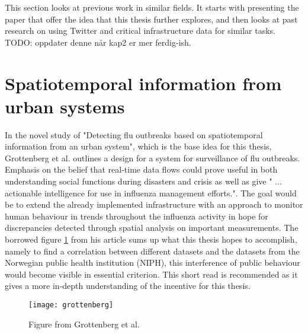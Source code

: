 This section looks at previous work in similar fields. It starts with presenting the paper that offer the idea that this thesis further explores, and then looks at past research on using Twitter and critical infrastructure data for similar tasks. TODO: oppdater denne når kap2 er mer ferdig-ish.

\section{Spatiotemporal information from urban systems}
In the novel study of "Detecting flu outbreaks based on spatiotemporal information from an urban system", which is the base idea for this thesis, Grottenberg et al. \cite{spatiotemp_urban_sys} outlines a design for a system for surveillance of flu outbreaks. Emphasis on the belief that real-time data flows could prove useful in both understanding social functions during disasters and crisis as well as give " ... actionable intelligence for use in influenza management efforts.". The goal would be to extend the already implemented infrastructure with an approach to monitor human behaviour in trends throughout the influenza activity in hope for discrepancies detected through spatial analysis on important measurements. The borrowed figure \ref{fig:grottenberg} from his article sums up what this thesis hopes to accomplish, namely to find a correlation between different datasets and the datasets from the Norwegian public health institution (NIPH), this interference of public behaviour would become visible in essential criterion.
This short read \cite{spatiotemp_urban_sys} is recommended as it gives a more in-depth understanding of the incentive for this thesis.

\begin{figure}[h]
\texttt{[image: grottenberg]}
\centering
\caption{Figure from Grottenberg et al. \cite{spatiotemp_urban_sys}}
\label{fig:grottenberg}
\end{figure}

